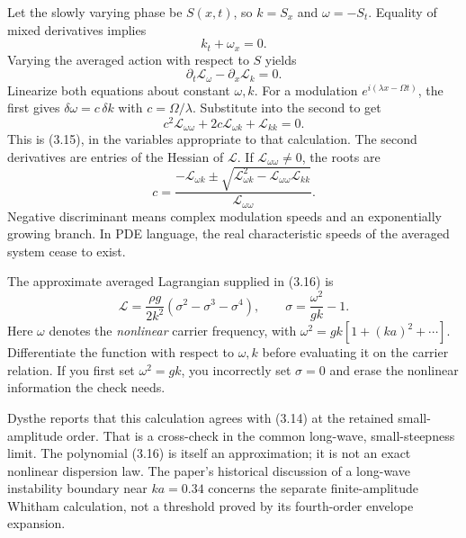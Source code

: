 Let the slowly varying phase be $S(x,t)$, so $k=S_x$ and $\omega=-S_t$.
Equality of mixed derivatives implies
\[
 k_t+\omega_x=0.
\]
Varying the averaged action with respect to $S$ yields
\[
 \partial_t\mathcal{L}_{\omega}-\partial_x\mathcal{L}_k=0.
\]
Linearize both equations about constant $\omega,k$. For a modulation
$e^{i(\lambda x-\Omega t)}$, the first gives
$\delta\omega=c\,\delta k$ with $c=\Omega/\lambda$.
Substitute into the second to get
\begin{equation}\label{eq:whitham}
 c^2\mathcal{L}_{\omega\omega}
 +2c\mathcal{L}_{\omega k}+\mathcal{L}_{kk}=0.
\end{equation}
This is (3.15), in the variables appropriate to that calculation.
The second derivatives are entries of the Hessian of $\mathcal{L}$.
If $\mathcal{L}_{\omega\omega}\ne0$, the roots are
\[
 c=\frac{-\mathcal{L}_{\omega k}\pm
 \sqrt{\mathcal{L}_{\omega k}^2-
       \mathcal{L}_{\omega\omega}\mathcal{L}_{kk}}}
 {\mathcal{L}_{\omega\omega}}.
\]
Negative discriminant means complex modulation speeds and an exponentially
growing branch. In PDE language, the real characteristic speeds of the
averaged system cease to exist.

The approximate averaged Lagrangian supplied in (3.16) is
\[
 \mathcal{L}=\frac{\rho g}{2k^2}(\sigma^2-\sigma^3-\sigma^4),
 \qquad \sigma=\frac{\omega^2}{gk}-1.
\]
Here $\omega$ denotes the \emph{nonlinear} carrier frequency, with
$\omega^2=gk[1+(ka)^2+\cdots]$. Differentiate the function with respect
to $\omega,k$ before evaluating it on the carrier relation. If you first
set $\omega^2=gk$, you incorrectly set $\sigma=0$ and erase the nonlinear
information the check needs.

Dysthe reports that this calculation agrees with (3.14) at the retained
small-amplitude order. That is a cross-check in the common long-wave,
small-steepness limit. The polynomial (3.16) is itself an approximation;
it is not an exact nonlinear dispersion law. The paper's historical
discussion of a long-wave instability boundary near $ka=0.34$ concerns
the separate finite-amplitude Whitham calculation, not a threshold proved
by its fourth-order envelope expansion.

